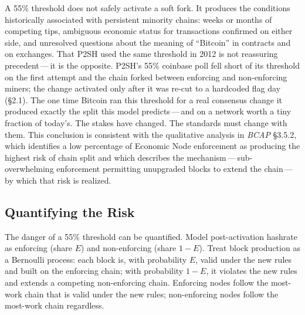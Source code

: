 \documentclass[11pt, twoside, openright]{book}
\newcommand{\sect}[1]{\S#1}
\begin{document}
A 55\% threshold does not safely activate a soft fork. It produces the conditions historically associated with persistent minority chains: weeks or months of competing tips, ambiguous economic status for transactions confirmed on either side, and unresolved questions about the meaning of ``Bitcoin'' in contracts and on exchanges. That P2SH used the same threshold in 2012 is not reassuring precedent\,---\,it is the opposite. P2SH's 55\% coinbase poll fell short of its threshold on the first attempt and the chain forked between enforcing and non-enforcing miners; the change activated only after it was re-cut to a hardcoded flag day (\sect{2.1}). The one time Bitcoin ran this threshold for a real consensus change it produced exactly the split this model predicts\,---\,and on a network worth a tiny fraction of today's. The stakes have changed. The standards must change with them. This conclusion is consistent with the qualitative analysis in \textit{BCAP} \sect{3.5.2}, which identifies a low percentage of Economic Node enforcement as producing the highest risk of chain split and which describes the mechanism\,---\,sub-overwhelming enforcement permitting unupgraded blocks to extend the chain\,---\,by which that risk is realized.

\subsection*{Quantifying the Risk}

The danger of a 55\% threshold can be quantified. Model post-activation hashrate as enforcing (share $E$) and non-enforcing (share $1-E$). Treat block production as a Bernoulli process: each block is, with probability $E$, valid under the new rules and built on the enforcing chain; with probability $1-E$, it violates the new rules and extends a competing non-enforcing chain. Enforcing nodes follow the most-work chain that is valid under the new rules; non-enforcing nodes follow the most-work chain regardless.
\end{document}
